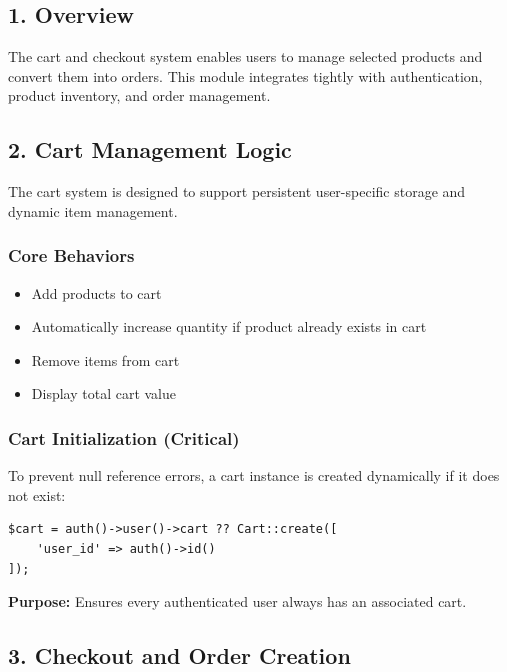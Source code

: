 \documentclass[12pt,a4paper]{article}
\begin{document}
\subsection{1. Overview}

The cart and checkout system enables users to manage selected products and convert them into orders. This module integrates tightly with authentication, product inventory, and order management.

\subsection{2. Cart Management Logic}

The cart system is designed to support persistent user-specific storage and dynamic item management.

\subsubsection{Core Behaviors}

\begin{itemize}[noitemsep]
    \item Add products to cart
    \item Automatically increase quantity if product already exists in cart
    \item Remove items from cart
    \item Display total cart value
\end{itemize}

\subsubsection{Cart Initialization (Critical)}

To prevent null reference errors, a cart instance is created dynamically if it does not exist:

\begin{verbatim}
$cart = auth()->user()->cart ?? Cart::create([
    'user_id' => auth()->id()
]);
\end{verbatim}

\textbf{Purpose:} Ensures every authenticated user always has an associated cart.

\subsection{3. Checkout and Order Creation}
\end{document}
